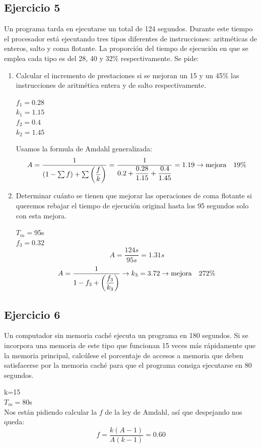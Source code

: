 \subsection{Ejercicio 5}
Un programa tarda en ejecutarse un total de 124 segundos. Durante este tiempo el procesador está ejecutando tres tipos diferentes de instrucciones: aritméticas de enteros, salto y coma flotante. La proporción del tiempo de ejecución en que se emplea cada tipo es del 28, 40 y 32\% respectivamente. Se pide:
\begin{enumerate}
    \item Calcular el incremento de prestaciones si se mejoran un 15 y un 45\% las instrucciones de aritmética entera y de salto respectivamente.
\begin{tcolorbox}[colback=white,colframe=cyan!50!black,fonttitle=\bfseries]
\begin{multicols}{2}
$f_1=0.28$\\
$k_1=1.15$\\
$f_2=0.4$\\
$k_2=1.45$
\end{multicols}
Usamos la formula de Amdahl generalizada:
\[
A=\dfrac{1}{(1-\sum f)+\sum\left(\dfrac{f}{k}\right)}=\dfrac{1}{0.2+\dfrac{0.28}{1.15}+\dfrac{0.4}{1.45}}=1.19\rightarrow\text{mejora}\quad19\%
\]
\end{tcolorbox}    
    \item Determinar cuánto se tienen que mejorar las operaciones de coma flotante si queremos rebajar el tiempo de ejecución original hasta los 95 segundos solo con esta mejora.
\begin{tcolorbox}[colback=white,colframe=cyan!50!black,fonttitle=\bfseries]
$T_m=$95s\\
$f_3=0.32$
\[
A=\dfrac{124s}{95s}=1.31s
\]
\[
A=\dfrac{1}{1-f_3+\left(\dfrac{f_3}{k_3}\right)}\rightarrow k_3=3.72\rightarrow\text{mejora}\quad 272\%
\]
\end{tcolorbox}    
\end{enumerate}
\subsection{Ejercicio 6}
\noindent
Un computador sin memoria caché ejecuta un programa en 180 segundos. Si se incorpora una memoria de este tipo que funcionan 15 veces más rápidamente que la memoria principal, calcúlese el porcentaje de accesos a memoria que deben satisfacerse por la memoria caché para que el programa consiga ejecutarse en 80 segundos.
\begin{tcolorbox}[colback=white,colframe=cyan!50!black,fonttitle=\bfseries]
k=15\\
$T_m=80$s\\
Nos están pidiendo calcular la $f$ de la ley de Amdahl, así que despejando nos queda:
\[
f=\dfrac{k(A-1)}{A(k-1)}=0.60
\]
\end{tcolorbox}
